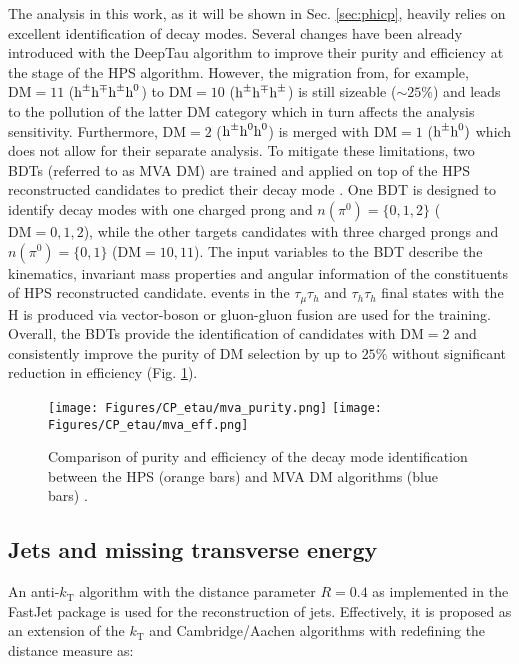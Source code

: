 The analysis in this work, as it will be shown in Sec. \ref{sec:phicp}, heavily relies on excellent identification of \tauh decay modes. Several changes have been already introduced with the DeepTau algorithm to improve their purity and efficiency at the stage of the HPS algorithm. However, the migration from, for example, $\text{DM}=11$ ($\text{h}^\pm\text{h}^\mp\text{h}^\pm\text{h}^0$) to $\text{DM}=10$ ($\text{h}^\pm\text{h}^\mp\text{h}^\pm$) is still sizeable ($\sim25\%$) and leads to the pollution of the latter DM category which in turn affects the analysis sensitivity. Furthermore, $\text{DM}=2$ ($\text{h}^\pm\text{h}^0\text{h}^0$) is merged with $\text{DM}=1$ ($\text{h}^\pm\text{h}^0)$ which does not allow for their separate analysis. To mitigate these limitations, two BDTs (referred to as MVA DM) are trained and applied on top of the HPS reconstructed \tauh candidates to predict their decay mode \cite{CMS-DP-2020-041}. One BDT is designed to identify decay modes with one charged prong and $n(\pi^0) = \{0,1,2\}$ ($\text{DM}=0,1,2$), while the other targets \tauh candidates with three charged prongs and $n(\pi^0) = \{0,1\}$ ($\text{DM}=10,11$). The input variables to the BDT describe the kinematics, invariant mass properties and angular information of the constituents of HPS reconstructed \tauh candidate. \htt events in the $\tau_\mu\tau_h$ and $\tau_h\tau_h$ final states with the H is produced via vector-boson or gluon-gluon fusion are used for the training. Overall, the BDTs provide the identification of \tauh candidates with $\text{DM}=2$ and consistently improve the purity of DM selection by up to $25\%$ without significant reduction in efficiency (Fig. \ref{fig:mva_dm}).  

\begin{figure}[t!]
    \centering
    \texttt{[image: Figures/CP\_etau/mva\_purity.png]}
    \texttt{[image: Figures/CP\_etau/mva\_eff.png]}
    \caption{Comparison of purity and efficiency of the \tauh decay mode identification between the HPS (orange bars) and MVA DM algorithms (blue bars) \cite{CMS-DP-2020-041}.}
    \label{fig:mva_dm}
\end{figure}



\subsection{Jets and missing transverse energy}\label{sec:jets}
An anti-$k_\text{T}$ algorithm \cite{Cacciari:2008gp} with the distance parameter $R=0.4$ as implemented in the FastJet package \cite{Cacciari:2011ma} is used for the reconstruction of jets. Effectively, it is proposed as an extension of the $k_\text{T}$ \cite{Ellis:1993tq} and Cambridge/Aachen \cite{Wobisch:1998wt} algorithms with redefining the distance measure as:


